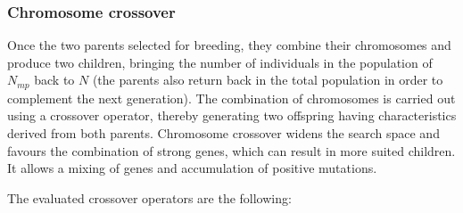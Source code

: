 \documentclass[twocol]{ametsoc}
\begin{document}
\subsubsection{Chromosome crossover}
			
Once the two parents selected for breeding, they combine their chromosomes and produce two children, bringing the number of individuals in the population of $N_{mp}$ back to $N$ (the parents also return back in the total population in order to complement the next generation). The combination of chromosomes is carried out using a crossover operator, thereby generating two offspring having characteristics derived from both parents. Chromosome crossover widens the search space and favours the combination of strong genes, which can result in more suited children. It allows a mixing of genes and accumulation of positive mutations.

The evaluated crossover operators are the following:
\end{document}
